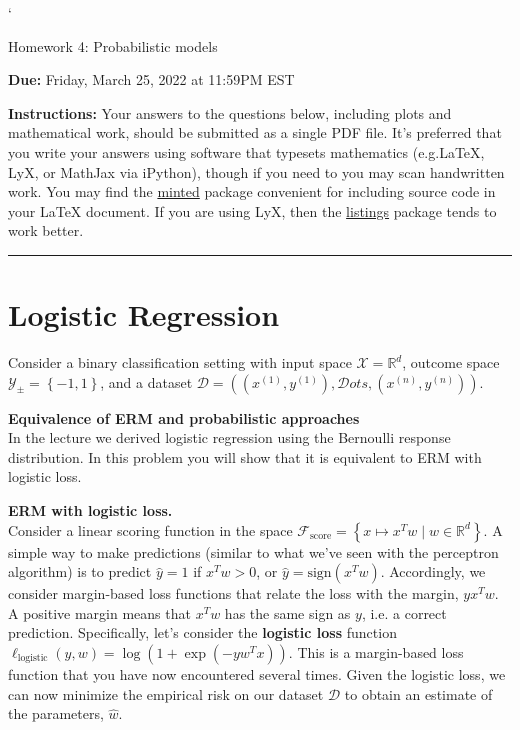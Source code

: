 `\documentclass{article}
\newcommand{\nyuparagraph}[1]{\vspace{0.3cm}\textcolor{nyupurple}{\bf \large #1}\\}
\newcommand{\ruleskip}{\bigskip\hrule\bigskip}
\theoremstyle{plain}
\theoremstyle{definition}
\begin{document}

\pagestyle{myheadings} 

\begin{center}
{\Large
Homework 4: Probabilistic models
} 
\end{center}

{
{ \color{nyupurple} \textbf{Due:} Friday, March 25, 2022 at 11:59PM EST} 
} 

\textbf{Instructions: }Your answers to the questions below, including plots and mathematical
 work, should be submitted as a single PDF file.  It's preferred that you write your answers using software that typesets mathematics (e.g.LaTeX, LyX, or MathJax via iPython), though if you need to you may scan handwritten work.  You may find the \href{https://github.com/gpoore/minted}{minted} package convenient for including source code in your LaTeX document.  If you are using LyX, then the \href{https://en.wikibooks.org/wiki/LaTeX/Source_Code_Listings}{listings} package tends to work better.

\ruleskip

\section{Logistic Regression}
\label{sec:lr}
Consider a binary classification setting with input
space $\mathcal{X}=\mathbb{R}^{d}$, outcome space $\mathcal{Y}_{\pm}=\left\{ -1,1\right\} $,
and a dataset $\mathcal{D}=\left((x^{(1)},y^{(1)}),\mathcal{D}ots,(x^{(n)},y^{(n)})\right)$.


\nyuparagraph{\label{subsec:erm-bernoulli-setup}Equivalence of ERM and probabilistic
approaches}
In the lecture we derived logistic regression using the Bernoulli response distribution.
In this problem you will show that it is equivalent to ERM with logistic loss.

\textbf{ERM with logistic loss.}\\
Consider a linear scoring function in the space $\mathcal{F}_{\text{score}}=\left\{ x\mapsto x^{T}w\mid w\in\mathbb{R}^{d}\right\} $.
A simple way to make predictions (similar to what we've seen with the perceptron algorithm)
is to predict $\hat{y}=1$ if $x^Tw > 0$, or $\hat{y} = \text{sign}(x^Tw)$.
Accordingly, we consider margin-based loss functions that relate the loss with the margin, $yx^Tw$.
A positive margin means that $x^Tw$ has the same sign as $y$, i.e. a correct prediction.
Specifically, let's consider the \textbf{logistic loss} function $\ell_{\text{logistic}}(y, w)=\log\left(1+\exp(-yw^Tx)\right)$.
This is a margin-based loss function that you have now encountered several times.
Given the logistic loss, we can now minimize the empirical risk on our dataset $\mathcal{D}$ to obtain an estimate of the parameters, $\hat{w}$.
\end{document}
